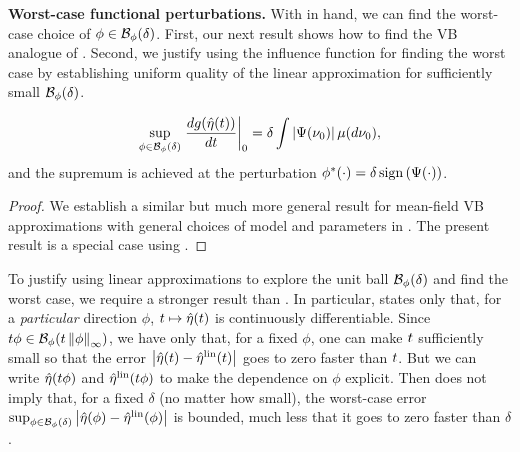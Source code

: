 
\noindent \textbf{Worst-case functional perturbations.}
%
With  in hand, we can find the worst-case
choice of $\phi \in \mathcal{B}_\phi(\delta)$. First, our next result shows how to
find the VB analogue of \citet[Result 11]{gustafson:1996:local}. Second, we
justify using the influence function for finding the worst case by establishing
uniform quality of the linear approximation for sufficiently small
$\mathcal{B}_\phi(\delta)$.

\begin{cor}
\begin{align*}
%
\sup_{\phi \in \ball_\phi(\delta)}
    \fracat{d g(\etaopt(\t))}{d \t}{0} =
        \delta \int \abs{\infl(\nu_0)} \mu(d\nu_0),
%
\end{align*}
%
and the supremum is achieved at the perturbation
$\phi^*(\cdot) = \delta \, \mathrm{sign}\left(\Psi(\cdot)\right)$.
%
\end{cor}
%
\begin{proof}
%
%
We establish a similar but much more general result for mean-field VB
approximations with general choices of model and parameters in
. The present result is a special case using
.
%
\end{proof}

To justify using linear approximations to explore the unit ball
$\mathcal{B}_\phi(\delta)$ and find the worst case, we require a stronger result than
. In particular,  states
only that, for a {\em particular} direction $\phi$, $t \mapsto \hat\eta(t)$ is
continuously differentiable.  Since $t \phi \in \mathcal{B}_\phi(t \left\Vert\phi\right\Vert_{\infty})$,
we have only that, for a fixed $\phi$, one can make $t$ sufficiently small so
that the error $\left|\hat\eta(t) - \hat\eta^{\mathrm{lin}}(t)\right|$ goes to zero faster than $t$.
But we can write $\hat\eta(t\phi)$ and $\hat\eta^{\mathrm{lin}}(t \phi)$ to make the dependence
on $\phi$ explicit. Then  does not imply that, for a
fixed $\delta$ (no matter how small), the worst-case error $\sup_{\phi \in
\mathcal{B}_\phi(\delta)} \left|\hat\eta(\phi) - \hat\eta^{\mathrm{lin}}(\phi)\right|$ is bounded, much less
that it goes to zero faster than $\delta$.

